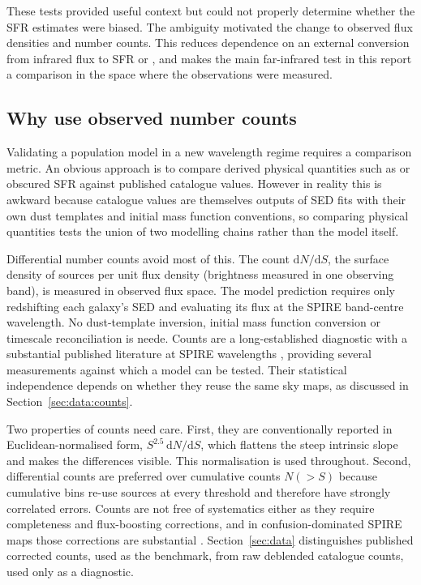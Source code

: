 \documentclass[12pt,a4paper]{article}
\begin{document}
These tests provided useful context but could not properly determine whether the
\popcosmos{} SFR estimates were biased. The ambiguity motivated the change to observed
flux densities and number
counts. This reduces dependence on an external conversion from infrared flux to SFR or
\LIR{}, and makes the main far-infrared test in this report a comparison in the space
where the observations were measured.

\subsection{Why use observed number counts}
\label{sec:intro:counts}

Validating a population model in a new wavelength regime requires a comparison metric.
  An obvious approach is to compare derived physical quantities such as \LIR{} or
  obscured SFR against published catalogue values. However in reality this is awkward because catalogue
\LIR{} values are themselves outputs of SED fits with their own dust templates and
initial mass function conventions, so comparing physical quantities tests the union of
two modelling chains rather than the model itself.

Differential number counts avoid most of this. The count $\mathrm{d}N/\mathrm{d}S$, the
surface density of sources per unit flux density (brightness measured in one observing
band), is measured in observed flux space. The model prediction requires only
redshifting each galaxy's SED and evaluating its flux at the SPIRE band-centre
wavelength. No dust-template inversion, initial mass function conversion or timescale
reconciliation is neede. Counts are a long-established diagnostic with a substantial
published literature at SPIRE wavelengths \citep{Clements_2010,Oliver_2010,
Glenn_2010,B_thermin_2010}, providing several measurements against which a model can be
tested. Their statistical independence depends on whether they reuse the same sky maps,
as discussed in Section~\ref{sec:data:counts}.

Two properties of counts need care. First, they are conventionally reported in
Euclidean-normalised form, $S^{2.5}\,\mathrm{d}N/\mathrm{d}S$, which flattens the
steep intrinsic slope and makes the differences visible. This normalisation is used
throughout. Second, differential counts are preferred over cumulative counts $N(>S)$
because cumulative bins re-use sources at every threshold and therefore have strongly
correlated errors. Counts are not free of systematics either as they require completeness
and flux-boosting corrections, and in confusion-dominated SPIRE maps those corrections
are substantial \citep{Nguyen_2010, Roseboom_2010}.
Section~\ref{sec:data} distinguishes published corrected counts, used as
the benchmark, from raw deblended catalogue counts, used only as a diagnostic.
\end{document}
